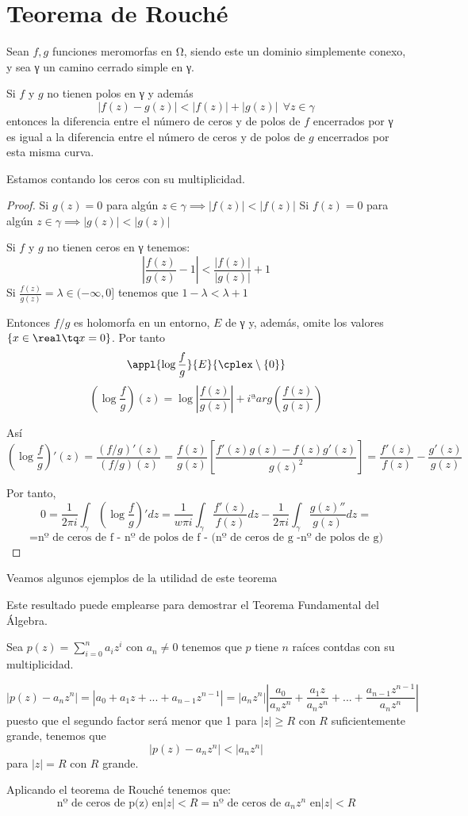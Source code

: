 \documentclass{apuntes}
\begin{document}
\section{Teorema de Rouché}
\begin{theorem}
Sean $f,g$ funciones meromorfas en Ω, siendo este un dominio simplemente conexo, y sea γ un camino cerrado simple en γ.

Si $f$ y $g$ no tienen polos en γ y además
\[|f(z)-g(z)| < |f(z)|+|g(z)| \ \ \forall z \in γ\]
entonces la diferencia entre el número de ceros y de polos de $f$ encerrados por γ es igual a la diferencia entre el número de ceros y de polos de $g$ encerrados por esta misma curva.

\obs Estamos contando los ceros con su multiplicidad.
\end{theorem}
\begin{proof}
Si $g(z)=0$ para algún $z \in γ \implies |f(z)|<|f(z)|$
Si $f(z)=0$ para algún $z \in γ \implies |g(z)|<|g(z)|$

Si $f$ y $g$ no tienen ceros en γ tenemos:
\[\left| \frac{f(z)}{g(z)}-1\right| < \frac{|f(z)|}{|g(z)|}+1\]
Si $\frac{f(z)}{g(z)}=λ\in (-\infty, 0]$ tenemos que $1-λ<λ+1$

Entonces $f/g$ es holomorfa en un entorno, $E$ de γ y, además, omite los valores $\{x \in \real \tq x=0\}$. Por tanto
\[\appl{\log\frac{f}{g}}{E}{\cplex \setminus \{0\}}\]
\[\left( \log \frac{f}{g}\right) (z) = \log \left|\frac{f(z)}{g(z)}\right| + iªarg \left(\frac{f(z)}{g(z)}\right)\]

Así
\[\left( \log \frac{f}{g}\right)'(z)=\frac{(f/g)'(z)}{(f/g)(z)}=\frac{f(z)}{g(z)}\left[ \frac{f'(z)g(z)-f(z)g'(z)}{g(z)^2} \right] = \frac{f'(z)}{f(z)}-\frac{g'(z)}{g(z)}\]

Por tanto,
\[0 = \frac{1}{2πi}\int_γ \left( \log \frac{f}{g}\right)'dz = \frac{1}{wπi}\int_γ \frac{f'(z)}{f(z)}dz - \frac{1}{2πi}\int_γ \frac{g(z)''}{g(z)}dz =\]
\[=\text{nº de ceros de f - nº de polos de f - (nº de ceros de g -nº de polos de g)}\]
\end{proof}

Veamos algunos ejemplos de la utilidad de este teorema
\begin{example}
Este resultado puede emplearse para demostrar el Teorema Fundamental del Álgebra.

Sea $p(z)=\sum_{i=0}^{n} a_iz^i$ con $a_n\neq 0$ tenemos que $p$ tiene $n$ raíces contdas con su multiplicidad.

\[|p(z)-a_nz^n| = |a_0+a_1z+...+a_{n-1}z^{n-1}| = |a_nz^n|\left| \frac{a_0}{a_nz^n}+ \frac{a_1z}{a_nz^n}+...+ \frac{a_{n-1}z^{n-1}}{a_nz^n}\right|\]
puesto que el segundo factor será menor que 1 para $|z|\geq R$ con $R$ suficientemente grande, tenemos que
\[|p(z)-a_nz^n|  < |a_nz^n|\]
para $|z|=R$ con $R$ grande.

Aplicando el teorema de Rouché tenemos que:
\[\text{nº de ceros de p(z) en} |z|<R = \text{nº de ceros de } a_nz^n \text{ en} |z| < R \]

\end{example}
\end{document}
